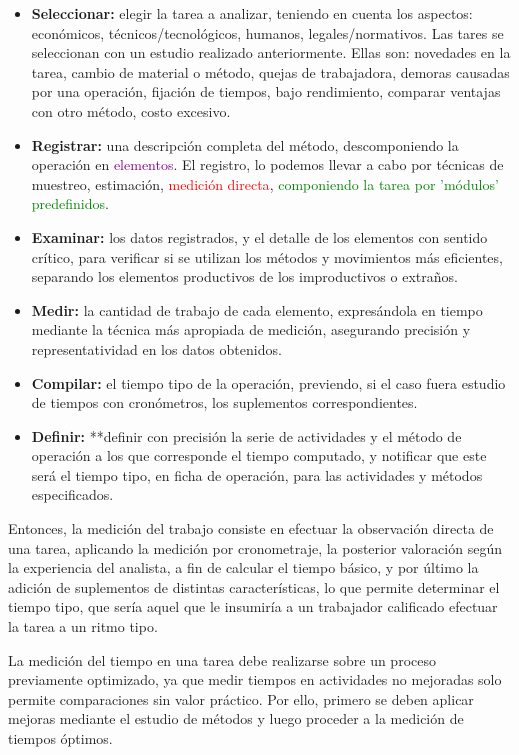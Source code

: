\documentclass[a4paper,oneside,11pt]{article}
\begin{document}
\begin{itemize}
    \item \textbf{Seleccionar:} elegir la tarea a analizar, teniendo en cuenta los aspectos: económicos, técnicos/tecnológicos, humanos, legales/normativos. Las tares se seleccionan con un estudio realizado anteriormente. Ellas son: novedades en la tarea, cambio de material o método, quejas de trabajadora, demoras causadas por una operación, fijación de tiempos, bajo rendimiento, comparar ventajas con otro método, costo excesivo.
    \item \textbf{Registrar:} una descripción completa del método, descomponiendo la operación en \textcolor{purple}{elementos}. El registro, lo  podemos llevar a cabo por técnicas de muestreo, estimación, \textcolor{red}{medición directa}, \textcolor{green}{componiendo la tarea por 'módulos' predefinidos}.
    \item \textbf{Examinar:} los datos registrados, y el detalle de los elementos con sentido crítico, para verificar si se utilizan los métodos y movimientos más eficientes, separando los elementos productivos de los improductivos o extraños.
    \item \textbf{Medir:} la cantidad de trabajo de cada elemento, expresándola en tiempo mediante la técnica más apropiada de medición, asegurando precisión y representatividad en los datos obtenidos.
    \item \textbf{Compilar:} el tiempo tipo de la operación, previendo, si el caso fuera estudio de tiempos con cronómetros, los suplementos correspondientes.
    \item \textbf{Definir:} **definir con precisión la serie de actividades y el método de operación a los que corresponde el tiempo computado, y notificar que este será el tiempo tipo, en ficha de operación, para las actividades y métodos especificados.
\end{itemize}

Entonces, la medición del trabajo consiste en efectuar la observación directa de una tarea, aplicando la medición por cronometraje, la posterior valoración según la experiencia del analista, a fin de calcular el tiempo básico, y por último la adición de suplementos de distintas características, lo que permite determinar el tiempo tipo, que sería aquel que le insumiría a un trabajador calificado efectuar la tarea a un ritmo tipo.

La medición del tiempo en una tarea debe realizarse sobre un proceso previamente optimizado, ya que medir tiempos en actividades no mejoradas solo permite comparaciones sin valor práctico. Por ello, primero se deben aplicar mejoras mediante el estudio de métodos y luego proceder a la medición de tiempos óptimos.  
\end{document}
